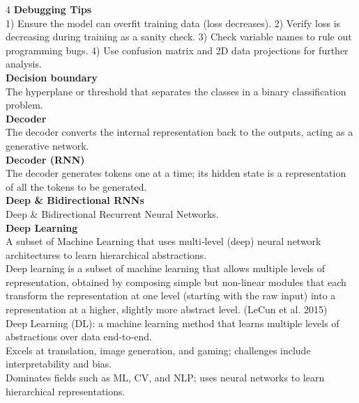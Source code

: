 \documentclass[8pt]{extarticle}
\begin{document}
\begin{multicols}{4}
\vspace{2pt}\textbf{Debugging Tips}\\
1) Ensure the model can overfit training data (loss decreases). 2) Verify loss is decreasing during training as a sanity check. 3) Check variable names to rule out programming bugs. 4) Use confusion matrix and 2D data projections for further analysis.\\
\vspace{2pt}\textbf{Decision boundary}\\
The hyperplane or threshold that separates the classes in a binary classification problem.\\
\vspace{2pt}\textbf{Decoder}\\
The decoder converts the internal representation back to the outputs, acting as a generative network.\\
\vspace{2pt}\textbf{Decoder (RNN)}\\
The decoder generates tokens one at a time; its hidden state is a representation of all the tokens to be generated.\\
\vspace{2pt}\textbf{Deep \& Bidirectional RNNs}\\
Deep \& Bidirectional Recurrent Neural Networks.\\
\vspace{2pt}\textbf{Deep Learning}\\
A subset of Machine Learning that uses multi‑level (deep) neural network architectures to learn hierarchical abstractions.\\
Deep learning is a subset of machine learning that allows multiple levels of representation, obtained by composing simple but non-linear modules that each transform the representation at one level (starting with the raw input) into a representation at a higher, slightly more abstract level. (LeCun et al. 2015)\\
Deep Learning (DL): a machine learning method that learns multiple levels of abstractions over data end-to-end.\\
Excels at translation, image generation, and gaming; challenges include interpretability and bias.\\
Dominates fields such as ML, CV, and NLP; uses neural networks to learn hierarchical representations.\\


\end{multicols}
\end{document}
